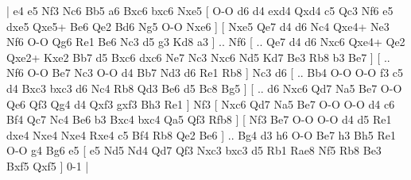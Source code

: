\makegametitle 
|   e4   e5    Nf3   Nc6    Bb5   a6    Bxc6   bxc6    Nxe5 [  O-O d6  d4 exd4  Qxd4 c5  Qc3 Nf6  e5 dxe5  Qxe5+ Be6  Qe2 Bd6  Ng5 O-O  Nxe6   ]  [  Nxe5 Qe7  d4 d6  Nc4 Qxe4+  Ne3 Nf6  O-O Qg6  Re1 Be6  Nc3 d5  g3 Kd8  a3   ] .. Nf6 [ .. Qe7  d4 d6  Nxc6 Qxe4+  Qe2 Qxe2+  Kxe2 Bb7  d5 Bxc6  dxc6 Ne7  Nc3 Nxc6  Nd5 Kd7  Be3 Rb8  b3 Be7   ]  [ .. Nf6  O-O Be7  Nc3 O-O  d4 Bb7  Nd3 d6  Re1 Rb8   ]  Nc3   d6 [ .. Bb4  O-O O-O  f3 c5  d4 Bxc3  bxc3 d6  Nc4 Rb8  Qd3 Be6  d5 Bc8  Bg5   ]  [ .. d6  Nxc6 Qd7  Na5 Be7  O-O Qe6  Qf3 Qg4  d4 Qxf3  gxf3 Bh3  Re1   ]  Nf3 [  Nxc6 Qd7  Na5 Be7  O-O O-O  d4 c6  Bf4 Qc7  Nc4 Be6  b3 Bxc4  bxc4 Qa5  Qf3 Rfb8   ]  [  Nf3 Be7  O-O O-O  d4 d5  Re1 dxe4  Nxe4 Nxe4  Rxe4 c5  Bf4 Rb8  Qe2 Be6   ] .. Bg4    d3   h6    O-O   Be7    h3   Bh5    Re1   O-O    g4   Bg6    e5    [  e5 Nd5  Nd4 Qd7  Qf3 Nxc3  bxc3 d5  Rb1 Rae8  Nf5 Rb8  Be3 Bxf5  Qxf5   ] 0-1  |
